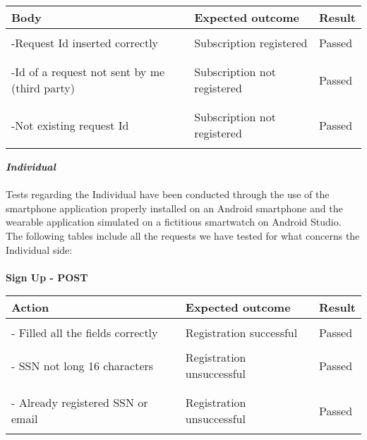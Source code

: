 \begin{center}
	\begin{tabular}{|p{}|p{}|p{}|}
		\hline
		Body & Expected outcome & Result \\
		\hline
		&&\\
		-Request Id inserted correctly&Subscription registered&Passed\\
		&&\\
		\hline
		&&\\
		-Id of a request not sent by me (third party)&Subscription not registered&Passed\\
		&&\\
		\hline
		&&\\
		-Not existing request Id &Subscription not registered&Passed\\
		&&\\
		\hline
	\end{tabular}
\end{center}

\newpage
\textbf{\textit{Individual}}\\\\
Tests regarding the Individual have been conducted through the use of the smartphone application properly installed on an Android smartphone and the wearable application simulated on a fictitious smartwatch on Android Studio.\\ 
The following tables include all the requests we have tested for what concerns the Individual side:\\\\

\textbf{Sign Up - POST}
\begin{center}
	\begin{tabular}{|p{}|p{}|p{}|}
		\hline
		Action & Expected outcome & Result \\
		\hline
		&&\\
		- Filled all the fields correctly&Registration successful&Passed\\
		\hline
		&&\\
		- SSN not long 16 characters&Registration unsuccessful&Passed\\
		&&\\
		\hline
		&&\\
		- Already registered SSN or email&Registration unsuccessful&Passed\\
		&&\\
		\hline
	\end{tabular}
\end{center}

